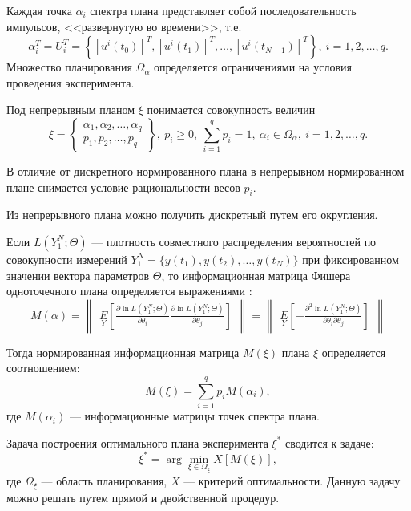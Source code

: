 \documentclass[a4paper,14pt]{extarticle}
\begin{document}
Каждая точка $\alpha_i$ спектра плана представляет собой последовательность
импульсов, <<развернутую во времени>>, т.е.
\[
	\alpha_i^T = U_i^T = \left\{ [u^i(t_0)]^T, [u^i(t_1)]^T, \ldots,
	[u^i(t_{N-1})]^T \right\},\ i = 1, 2, \ldots, q.
\]
Множество планирования $\Omega_{\alpha}$ определяется ограничениями на условия
проведения эксперимента.

Под непрерывным планом $\xi$ понимается совокупность величин
\begin{equation*}
	\xi = \left\{
		\begin{array}{cc} 
			\alpha_1, \alpha_2, \ldots, \alpha_q \\
			p_1, p_2, \ldots, p_q	
		\end{array} \right\},\ 
	p_i \ge 0,\ 
	\sum\limits_{i=1}^q p_i = 1,\ \alpha_i \in \Omega_{\alpha},\ 
	i = 1, 2, \ldots, q.
\end{equation*}

В отличие от дискретного нормированного плана в непрерывном нормированном плане
снимается условие рациональности весов $p_i$.

Из непрерывного плана можно получить дискретный путем его округления.

Если $L(Y_1^N; \Theta)$ --- плотность совместного распределения вероятностей по
совокупности измерений $Y_1^N = \{ y(t_1), y(t_2), \ldots, y(t_N) \}$ при
фиксированном значении вектора параметров $\Theta$, то информационная матрица
Фишера одноточечного плана определяется выражениями \cite{mono}:
\begin{equation*}
	M(\alpha) = 
	\begin{Vmatrix} 
		\underset{Y}{E}
		\left[ 
			\frac{\partial \ln L(Y_1^N; \Theta)}{\partial \theta_i}
			\frac{\partial \ln L(Y_1^N; \Theta)}{\partial \theta_j}
		\right]
	\end{Vmatrix} =
	\begin{Vmatrix} 
		\underset{Y}{E}
		\left[ 
			-\frac{\partial^2 \ln L(Y_1^N; \Theta)}
			{\partial \theta_i \partial \theta_j}
		\right]
	\end{Vmatrix}
\end{equation*}

Тогда нормированная информационная матрица $M(\xi)$ плана $\xi$ определяется
соотношением:
\[
	M(\xi) = \sum\limits_{i=1}^q p_i M(\alpha_i),
\]
где $M(\alpha_i)$ --- информационные матрицы точек спектра плана.

Задача построения оптимального плана эксперимента $\xi^*$ сводится к задаче:
\[
	\xi^* = \arg \min\limits_{\xi \in \Omega_{\xi}} X[M(\xi)],
\]
где $\Omega_{\xi}$ --- область планирования, $X$ --- критерий оптимальности.
Данную задачу можно решать путем прямой и двойственной процедур.
\end{document}
